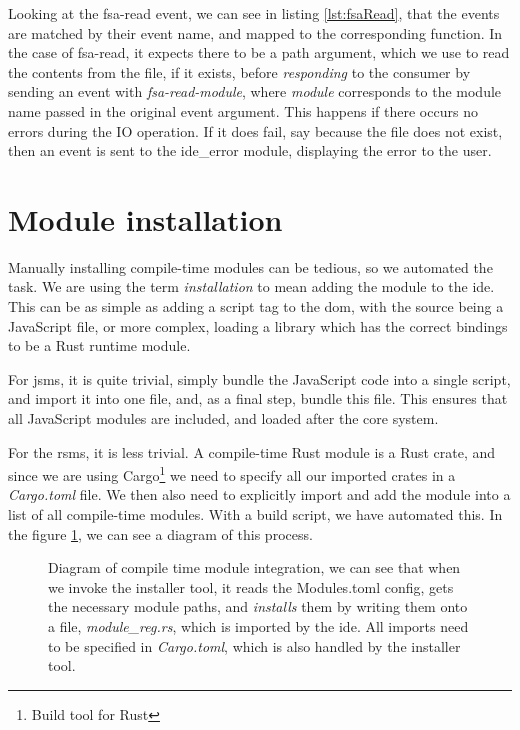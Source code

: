 Looking at the fsa-read event, we can see in listing \ref{lst:fsaRead}, that the
events are matched by their event name, and mapped to the corresponding function.
In the case of fsa-read, it expects there to be a path argument, which we use to
read the contents from the file, if it exists, before \textit{responding} to the
consumer by sending an event with \textit{fsa-read-module}, where
\textit{module} corresponds to the module name passed in the original event
argument. This happens if there occurs no errors\footnotemark{} during the IO
operation. If it does fail, say because the file does not exist, then an event
is sent to the ide\_error module, displaying the error to the user.



\section{Module installation} \label{sec:module-installation}

Manually installing compile-time modules can be tedious, so we automated the
task. We are using the term \textit{installation} to mean adding the module to
the \gls*{ide}. This can be as simple as adding a script tag to the \gls*{dom},
with the source being a JavaScript file, or more complex, loading a library
which has the correct bindings to be a Rust runtime module.

For \gls*{jsms}, it is quite trivial, simply bundle the JavaScript code into a
single script, and import it into one file, and, as a final step, bundle this
file. This ensures that all JavaScript modules are included, and loaded after
the core system.

For the \gls*{rsms}, it is less trivial. A compile-time Rust module is a Rust
crate, and since we are using Cargo\footnote{Build tool for Rust} we need to
specify all our imported crates in a \textit{Cargo.toml} file. We then also
need to explicitly import and add the module into a list of all compile-time
modules. With a build script, we have automated this. In the figure
\ref{fig:compMod}, we can see a diagram of this process.

\begin{figure}
  \centering
  
  \caption{
    Diagram of compile time module integration, we can see that when we invoke
    the installer tool, it reads the Modules.toml config, gets the necessary
    module paths, and \textit{installs} them by writing them onto a file,
    \textit{module\_reg.rs}, which is imported by the \gls*{ide}. All imports
    need to be specified in \textit{Cargo.toml}, which is also handled by the
    installer tool.
  }
  \label{fig:compMod}
\end{figure}

